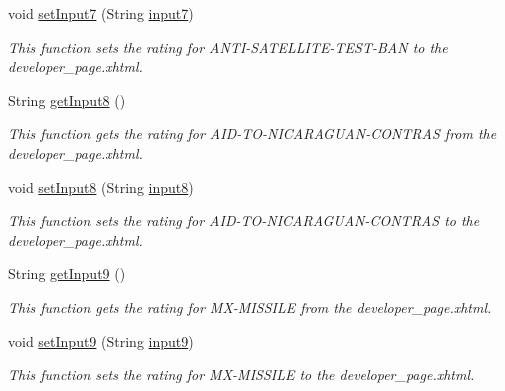 \begin{DoxyCompactItemize}
void \hyperlink{classorg_1_1jboss_1_1as_1_1quickstarts_1_1greeter_1_1web_1_1_general_controller_a034f79930b8bea1713539c40cc70e823}{set\+Input7} (String \hyperlink{classorg_1_1jboss_1_1as_1_1quickstarts_1_1greeter_1_1web_1_1_general_controller_aaf50467e20e2aea453efe68f4a3b9b2a}{input7})
\begin{DoxyCompactList}\small\item\em This function sets the rating for A\+N\+T\+I-\/\+S\+A\+T\+E\+L\+L\+I\+T\+E-\/\+T\+E\+S\+T-\/\+B\+AN to the developer\+\_\+page.\+xhtml. \end{DoxyCompactList}\item 
String \hyperlink{classorg_1_1jboss_1_1as_1_1quickstarts_1_1greeter_1_1web_1_1_general_controller_add751929f6aad28109c2dcfbc39404a5}{get\+Input8} ()
\begin{DoxyCompactList}\small\item\em This function gets the rating for A\+I\+D-\/\+T\+O-\/\+N\+I\+C\+A\+R\+A\+G\+U\+A\+N-\/\+C\+O\+N\+T\+R\+AS from the developer\+\_\+page.\+xhtml. \end{DoxyCompactList}\item 
void \hyperlink{classorg_1_1jboss_1_1as_1_1quickstarts_1_1greeter_1_1web_1_1_general_controller_a6a6e3698c0c1e1ceb8730c78df500528}{set\+Input8} (String \hyperlink{classorg_1_1jboss_1_1as_1_1quickstarts_1_1greeter_1_1web_1_1_general_controller_a747d34f63d5a3c1693da9f3b8cf64b9a}{input8})
\begin{DoxyCompactList}\small\item\em This function sets the rating for A\+I\+D-\/\+T\+O-\/\+N\+I\+C\+A\+R\+A\+G\+U\+A\+N-\/\+C\+O\+N\+T\+R\+AS to the developer\+\_\+page.\+xhtml. \end{DoxyCompactList}\item 
String \hyperlink{classorg_1_1jboss_1_1as_1_1quickstarts_1_1greeter_1_1web_1_1_general_controller_a46c49abfded9d88cc4a214f861363057}{get\+Input9} ()
\begin{DoxyCompactList}\small\item\em This function gets the rating for M\+X-\/\+M\+I\+S\+S\+I\+LE from the developer\+\_\+page.\+xhtml. \end{DoxyCompactList}\item 
void \hyperlink{classorg_1_1jboss_1_1as_1_1quickstarts_1_1greeter_1_1web_1_1_general_controller_a9ce8397b039d11858d116439136d85c7}{set\+Input9} (String \hyperlink{classorg_1_1jboss_1_1as_1_1quickstarts_1_1greeter_1_1web_1_1_general_controller_a466e88fd161171cdb05156b20a7f1196}{input9})
\begin{DoxyCompactList}\small\item\em This function sets the rating for M\+X-\/\+M\+I\+S\+S\+I\+LE to the developer\+\_\+page.\+xhtml. \end{DoxyCompactList}\item 

\end{DoxyCompactItemize}
